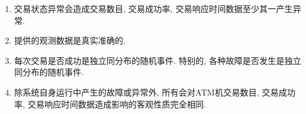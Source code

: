 \begin{enumerate}
    \item 交易状态异常会造成交易数目, 交易成功率, 交易响应时间数据至少其一产生异常.\\
    \item 提供的观测数据是真实准确的.\\
    \item 每次交易是否成功是独立同分布的随机事件. 特别的, 各种故障是否发生是独立同分布的随机事件.\\
    \item 除系统自身运行中产生的故障或异常外, 所有会对ATM机交易数目, 交易成功率, 交易响应时间数据造成影响的客观性质完全相同.\\
\end{enumerate}
